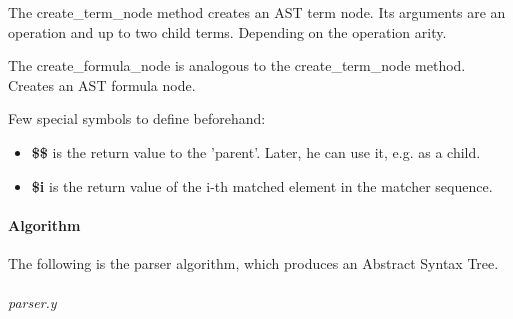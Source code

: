\documentclass{article}
\begin{document}
			The create\_term\_node method creates an AST term node. Its arguments are an operation and up to two child terms. Depending on the operation arity.

			The create\_formula\_node is analogous to the create\_term\_node method. Creates an AST formula node.

			Few special symbols to define beforehand:
			\begin{itemize}
				\item \textbf{\$\$} is the return value to the 'parent'. Later, he can use it, e.g. as a child.
				\item \textbf{\$i} is the return value of the i-th matched element in the matcher sequence.
			\end{itemize}

		\paragraph{Algorithm} The following is the parser algorithm, which produces an Abstract Syntax Tree.
	\\
	\\
\noindent
\textit{parser.y}
\end{document}
